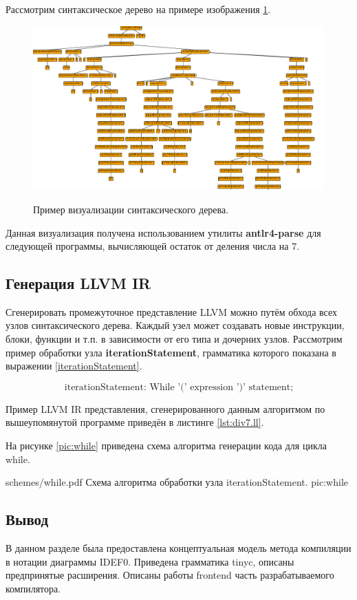 Рассмотрим синтаксическое дерево на примере изображения \ref{div7:tree}.
\begin{figure}[h!]
	\begin{center}
		{\includegraphics[width=0.85\textheight, angle = 90]{img/div7.pdf}}
		\caption{Пример визуализации синтаксического дерева.}
		\label{div7:tree}
	\end{center}
\end{figure}
\pagebreak

Данная визуализация получена использованием утилиты \textbf{antlr4-parse} для следующей программы, вычисляющей остаток от деления числа на 7.

\label{lst:fib}

\subsection{Генерация LLVM IR}
Сгенерировать промежуточное представление LLVM можно путём обхода всех узлов синтаксического дерева. Каждый узел может создавать новые инструкции, блоки, функции и т.п. в зависимости от его типа и дочерних узлов. Рассмотрим пример обработки узла \textbf{iterationStatement}, грамматика которого показана в выражении \ref{iterationStatement}.

\begin{equation}
    \label{iterationStatement}
    \text{iterationStatement: While '(' expression ')' statement;}
\end{equation}

Пример LLVM IR представления, сгенерированного данным алгоритмом по вышеупомянутой программе приведён в листинге \ref{lst:div7.ll}.

\label{lst:div7.ll}

На рисунке \ref{pic:while} приведена схема алгоритма генерации кода для цикла while.

\myImage
{schemes/while.pdf}
{Схема алгоритма обработки узла iterationStatement.}
{pic:while}

\subsection*{Вывод}
В данном разделе была предоставлена концептуальная модель метода компиляции в нотации диаграммы IDEF0. Приведена грамматика tinyc, описаны предпринятые расширения. Описаны работы frontend часть разрабатываемого компилятора.

\pagebreak
